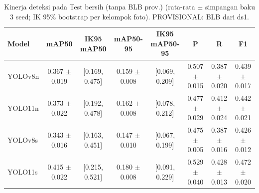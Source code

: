 \begin{table}[!t]
\centering
\caption{Kinerja deteksi pada Test bersih (tanpa BLB prov.) (rata-rata $\pm$ simpangan baku 3 seed; IK 95\% bootstrap per kelompok foto). PROVISIONAL: BLB dari ds1.}
\label{tab:utama_test_bersih}
\footnotesize
\begin{tabular}{lccccccc}
\hline
\textbf{Model} & \textbf{mAP50} & \textbf{IK95 mAP50} & \textbf{mAP50-95} & \textbf{IK95 mAP50-95} & \textbf{P} & \textbf{R} & \textbf{F1} \\
\hline
YOLOv8n & 0.367 $\pm$ 0.019 & [0.169, 0.475] & 0.159 $\pm$ 0.008 & [0.069, 0.209] & 0.507 $\pm$ 0.015 & 0.387 $\pm$ 0.020 & 0.439 $\pm$ 0.017 \\
YOLO11n & 0.373 $\pm$ 0.022 & [0.192, 0.478] & 0.162 $\pm$ 0.008 & [0.078, 0.212] & 0.477 $\pm$ 0.029 & 0.412 $\pm$ 0.024 & 0.442 $\pm$ 0.021 \\
YOLOv8s & 0.343 $\pm$ 0.016 & [0.163, 0.451] & 0.147 $\pm$ 0.010 & [0.067, 0.199] & 0.475 $\pm$ 0.005 & 0.387 $\pm$ 0.016 & 0.426 $\pm$ 0.012 \\
YOLO11s & 0.415 $\pm$ 0.022 & [0.215, 0.521] & 0.180 $\pm$ 0.008 & [0.091, 0.229] & 0.529 $\pm$ 0.040 & 0.428 $\pm$ 0.013 & 0.472 $\pm$ 0.020 \\
\hline
\end{tabular}
\end{table}
